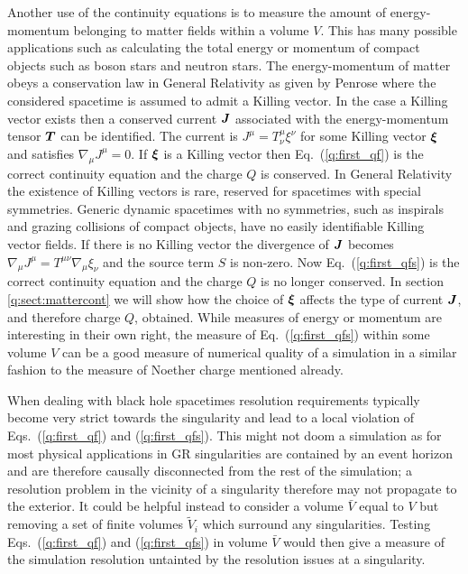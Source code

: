 Another use of the continuity equations is to measure the amount of energy-momentum belonging to matter fields within a volume $V$. This has many possible applications such as calculating the total energy or momentum of compact objects such as boson stars and neutron stars. The energy-momentum of matter obeys a conservation law in General Relativity as given by Penrose \cite{10.2307/2397365} where the considered spacetime is assumed to admit a Killing vector. In the case a Killing vector exists then a conserved current $\boldsymbol{J}$ associated with the energy-momentum tensor $\boldsymbol{T}$ can be identified. The current is $J^\mu = T^\mu_\nu \xi^\nu$ for some Killing vector $\boldsymbol{\xi}$ and satisfies $\nabla_\mu J^\mu = 0$. If $\boldsymbol{\xi}$ is a Killing vector then Eq.~(\ref{q:first_qf}) is the correct continuity equation and the charge $Q$ is conserved. In General Relativity the existence of Killing vectors is rare, reserved for spacetimes with special symmetries. Generic dynamic spacetimes with no symmetries, such as inspirals and grazing collisions of compact objects, have no easily identifiable Killing vector fields. If there is no Killing vector the divergence of $\boldsymbol{J}$ becomes $\nabla_\mu J^\mu = T^{\mu\nu}\nabla_\mu \xi_\nu$ and the source term ${S}$ is non-zero. Now Eq.~(\ref{q:first_qfs}) is the correct continuity equation and the charge $Q$ is no longer conserved. In section \ref{q:sect:mattercont} we will show how the choice of $\boldsymbol{\xi}$ affects the type of current $\boldsymbol{J}$, and therefore charge $Q$, obtained. While measures of energy or momentum are interesting in their own right, the measure of Eq.~(\ref{q:first_qfs}) within some volume ${V}$ can be a good measure of numerical quality of a simulation in a similar fashion to the measure of Noether charge mentioned already.

When dealing with black hole spacetimes resolution requirements typically become very strict towards the singularity and lead to a local violation of Eqs.~(\ref{q:first_qf}) and (\ref{q:first_qfs}). This might not doom a simulation as for most physical applications in GR singularities are contained by an event horizon and are therefore causally disconnected from the rest of the simulation; a resolution problem in the vicinity of a singularity therefore may not propagate to the exterior. It could be helpful instead to consider a volume $\bar{V}$ equal to $V$ but removing a set of finite volumes $\tilde{V}_i$ which surround any singularities. Testing Eqs.~(\ref{q:first_qf}) and (\ref{q:first_qfs}) in volume $\bar{V}$ would then give a measure of the simulation resolution untainted by the resolution issues at a singularity.

